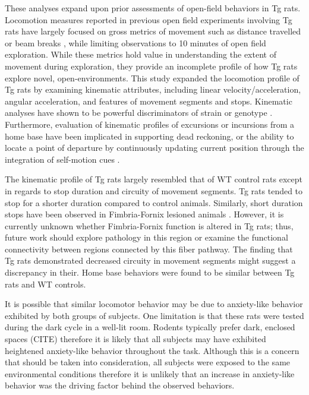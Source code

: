 \documentclass[fleqn,10pt]{wlscirep}
\begin{document}
These analyses expand upon prior assessments of open-field behaviors in Tg rats. Locomotion measures reported in previous open field experiments involving Tg rats have largely focused on gross metrics of movement such as distance travelled \cite{morrone_regional_2020,voorhees_occupational-like_2019,voorhees_-p7c3-s243_2018} or beam breaks \cite{cohen_transgenic_2013}, while limiting observations to 10 minutes of open field exploration. While these metrics hold value in understanding the extent of movement during exploration, they provide an incomplete profile of how Tg rats explore novel, open-environments. This study expanded the locomotion profile of Tg rats by examining kinematic attributes, including linear velocity/acceleration, angular acceleration, and features of movement segments and stops. Kinematic analyses have shown to be powerful discriminators of strain or genotype \cite{benjamini_ten_2010}. Furthermore, evaluation of kinematic profiles of excursions or incursions from a home base have been implicated in supporting dead reckoning, or the ability to locate a point of departure by continuously updating current position through the integration of self-motion cues \cite{wallace_fractionating_2008,wallace_movement_2006,wallace_quantification_2002}.


The kinematic profile of Tg rats largely resembled that of WT control rats except in regards to stop duration and circuity of movement segments. Tg rats tended to stop for a shorter duration compared to control animals. Similarly, short duration stops have been observed in Fimbria-Fornix lesioned animals \cite{whishaw_short-stops_1994}. However, it is currently unknown whether Fimbria-Fornix function is altered in Tg rats; thus, future work should explore pathology in this region or examine the functional connectivity between regions connected by this fiber pathway. The finding that Tg rats demonstrated decreased circuity in movement segments might suggest a discrepancy in their.  
Home base behaviors were found to be similar between Tg rats and WT controls.

It is possible that similar locomotor behavior may be due to anxiety-like behavior exhibited by both groups of subjects. One limitation is that these rats were tested during the dark cycle in a well-lit room. Rodents typically prefer dark, enclosed spaces (CITE) therefore it is likely that all subjects may have exhibited heightened anxiety-like behavior throughout the task. Although this is a concern that should be taken into consideration, all subjects were exposed to the same environmental conditions therefore it is unlikely that an increase in anxiety-like behavior was the driving factor behind the observed behaviors. 
\end{document}
